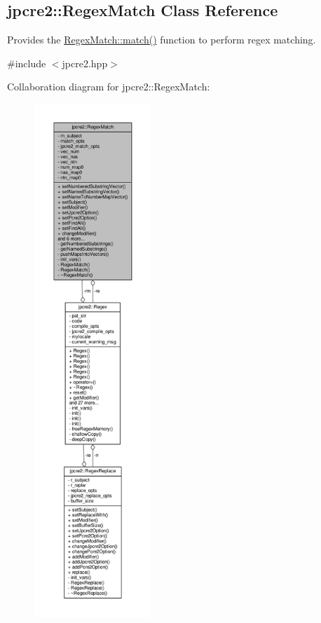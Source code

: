 \hypertarget{classjpcre2_1_1RegexMatch}{}\subsection{jpcre2\+:\+:Regex\+Match Class Reference}
\label{classjpcre2_1_1RegexMatch}


Provides the \hyperlink{classjpcre2_1_1RegexMatch_a5868aef3a146594ea1ebef34d122bb33}{Regex\+Match\+::match()} function to perform regex matching.  




{\ttfamily \#include $<$jpcre2.\+hpp$>$}



Collaboration diagram for jpcre2\+:\+:Regex\+Match\+:\nopagebreak
\begin{figure}[H]
\begin{center}
\leavevmode
\includegraphics[height=550pt]{classjpcre2_1_1RegexMatch__coll__graph}
\end{center}
\end{figure}
